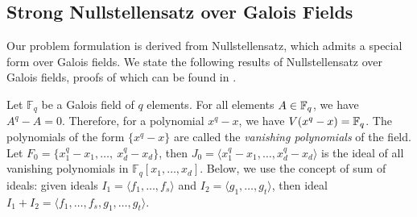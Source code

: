 



\subsection{Strong Nullstellensatz over Galois Fields}

Our problem formulation is derived from Nullstellensatz, which admits
a special form over Galois fields. We state the following results of
Nullstellensatz over Galois fields, proofs of which can be found in
\cite{gao:gf-gb-ms}.   

Let ${\mathbb{F}}_q$ be a Galois field of $q$ elements. For all elements
$A \in {\mathbb{F}}_{q}$, we have $A^q - A = 0$. Therefore, for a polynomial $x^q -
x$, we have $V(x^q - x) = {\mathbb{F}}_{q}$.
The polynomials of the form $\{x^q - x\}$ are called the {\it
  vanishing polynomials} of the field. Let $F_0 = \{x_1^q - x_1,
\dots, ~x_d^q - x_d\}$, then $J_0 = \langle x_1^q - x_1, \dots, x_d^q
- x_d\rangle$ is the ideal of all vanishing polynomials in
$\mathbb{F}_q[x_1,\dots,   x_d]$. Below, we use the concept of sum of
ideals: given ideals $I_1 = \langle f_1, \dots, f_s \rangle$ and $I_2
= \langle g_1, \dots, g_t \rangle$, then ideal $I_1 + I_2 = \langle
f_1, \dots, f_s, g_1, \dots, g_t\rangle$. 



